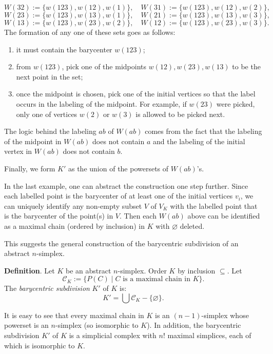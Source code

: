 \documentclass[12pt]{article}
\begin{document}
\begin{itemize}
$$W(32):=\lbrace w(123), w(12), w(1) \rbrace,\quad W(31):=\lbrace w(123), w(12), w(2) \rbrace,$$
$$W(23):=\lbrace w(123), w(13), w(1) \rbrace,\quad W(21):=\lbrace w(123), w(13), w(3) \rbrace,$$
$$W(13):=\lbrace w(123), w(23), w(2) \rbrace,\quad W(12):=\lbrace w(123), w(23), w(3) \rbrace.$$
The formation of any one of these sets goes as follows:
\begin{enumerate}
\item it must contain the barycenter $w(123)$;
\item from $w(123)$, pick one of the midpoints $w(12),w(23),w(13)$ to be the next point in the set;
\item once the midpoint is chosen, pick one of the initial vertices so that the label occurs in the labeling of the midpoint.  For example, if $w(23)$ were picked, only one of vertices $w(2)$ or $w(3)$ is allowed to be picked next.
\end{enumerate}
The logic behind the labeling $ab$ of $W(ab)$ comes from the fact that the labeling of the midpoint in $W(ab)$ does not contain $a$ and the labeling of the initial vertex in $W(ab)$ does not contain $b$.

Finally, we form $K'$ as the union of the powersets of $W(ab)$'s.
\end{itemize}

In the last example, one can abstract the construction one step further.  Since each labelled point is the barycenter of at least one of the initial vertices $v_i$, we can uniquely identify any non-empty subset $V$ of $V_K$ with the labelled point that is the barycenter of the point(s) in $V$.  Then each $W(ab)$ above can be identified as a maximal chain (ordered by inclusion) in $K$ with $\varnothing$ deleted.

This suggests the general construction of the barycentric subdivision of an abstract $n$-simplex.

\textbf{Definition}.  Let $K$ be an abstract $n$-simplex.  Order $K$ by inclusion $\subseteq$.  Let $$\mathcal{C}_K:=\big\lbrace P(C) \mid C\mbox{ is a maximal chain in }K\big\rbrace.$$  The \emph{barycentric subdivision} $K'$ of $K$ is:
$$K'=\bigcup \mathcal{C}_K - \lbrace \varnothing\rbrace.$$

It is easy to see that every maximal chain in $K$ is an $(n-1)$-simplex whose powerset is an $n$-simplex (so isomorphic to $K$).  In addition, the barycentric subdivision $K'$ of $K$ is a simplicial complex with $n!$ maximal simplices, each of which is isomorphic to $K$.
\end{document}
